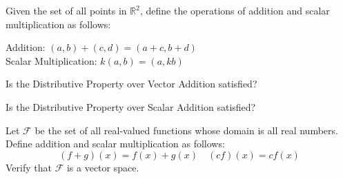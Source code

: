 \documentclass{ximera}
\begin{document}
  \begin{problem}\label{prob:abstractvectspace3}
  Given the set of all points in $\mathbb{R}^2$, define the operations of addition and scalar multiplication as follows:
   
   Addition: $(a, b)+(c, d)=(a+c, b+d)$\\ Scalar Multiplication: $k(a, b)=(a, kb)$

   Is the Distributive Property over Vector Addition satisfied?
\begin{multipleChoice}
  \end{multipleChoice}

  Is the Distributive Property over Scalar Addition satisfied?
\begin{multipleChoice}
  \end{multipleChoice}
   
   \end{problem}
  
 
   
 \begin{problem}\label{prob:abstractvectspace5}
 Let $\mathcal{F}$ be the set of all real-valued functions whose domain is all real numbers.  Define addition and scalar multiplication as follows:
 $$(f+g)(x)=f(x)+g(x)\quad (cf)(x)=cf(x)$$
 Verify that $\mathcal{F}$ is a vector space.
 \end{problem}
 
  
\end{document}
